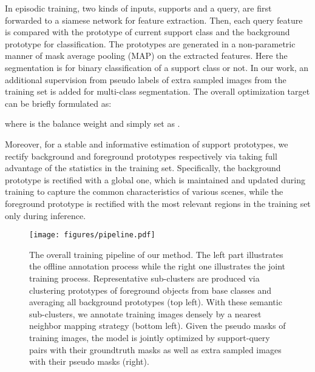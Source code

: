 \documentclass[10pt,twocolumn,letterpaper]{article}
\begin{document}
In episodic training, two kinds of inputs, \ie supports and a query, are first forwarded to a siamese network for feature extraction. Then, each query feature is compared with the prototype of current support class and the background prototype for classification. The prototypes are generated in a non-parametric manner of mask average pooling (MAP) on the extracted features. Here the segmentation is for binary classification of a support class or not. In our work, an additional supervision from pseudo labels of extra sampled images from the training set is added for multi-class segmentation. The overall optimization target can be briefly formulated as:
\vspace{-0.1cm}

where  is the balance weight and simply set as . 

Moreover, for a stable and informative estimation of support prototypes, we rectify background and foreground prototypes respectively via taking full advantage of the statistics in the training set. Specifically, the background prototype is rectified with a global one, which is maintained and updated during training to capture the common characteristics of various scenes, while the foreground prototype is rectified with the most relevant regions in the training set only during inference.

\begin{figure*}
\centering
\texttt{[image: figures/pipeline.pdf]}
\caption{The overall training pipeline of our method. The left part illustrates the offline annotation process while the right one illustrates the joint training process. Representative sub-clusters are produced via clustering prototypes of foreground objects from base classes and averaging all background prototypes (top left). With these semantic sub-clusters, we annotate training images densely by a nearest neighbor mapping strategy (bottom left). Given the pseudo masks of training images, the model is jointly optimized by support-query pairs with their groundtruth masks as well as extra sampled images with their pseudo masks (right).}
\label{network}
\vspace{-0.2cm}
\end{figure*}
\end{document}
